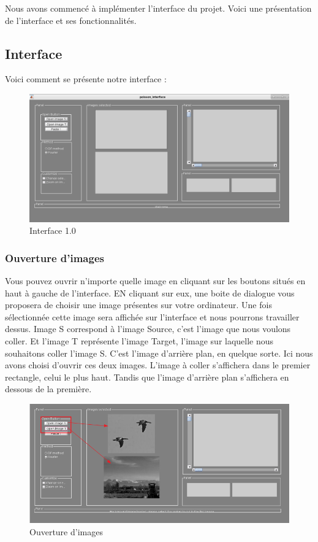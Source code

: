 Nous avons commencé à implémenter l'interface du projet.
Voici une présentation de l'interface et ses fonctionnalités.

\subsection{Interface}
Voici comment se présente notre interface : 
\begin{figure}[!h]
    \centering
    \includegraphics[scale = 0.2]{Images/interface.png}
    \caption{Interface 1.0}
\end{figure}{}
\subsubsection{Ouverture d'images}
Vous pouvez ouvrir n'importe quelle image en cliquant sur les boutons situés en haut à gauche de l'interface. EN cliquant sur eux, une boite de dialogue vous proposera de choisir une image présentes sur votre ordinateur. Une fois sélectionnée cette image sera affichée sur l'interface et nous pourrons travailler dessus. Image S correspond à l'image Source, c'est l'image que nous voulons coller. Et l'image T représente l'image Target, l'image sur laquelle nous souhaitons coller l'image S. C'est l'image d'arrière plan, en quelque sorte.\newline
Ici nous avons choisi d'ouvrir ces deux images. L'image à coller s'affichera dans le premier rectangle, celui le plus haut. Tandis que l'image d'arrière plan s'affichera en dessous de la première. 
\begin{figure}[!ht]
    \centering
    \includegraphics[scale = 0.3]{Images/images_ouvertes.png}
    \caption{Ouverture d'images}
\end{figure}{}
\newpage
